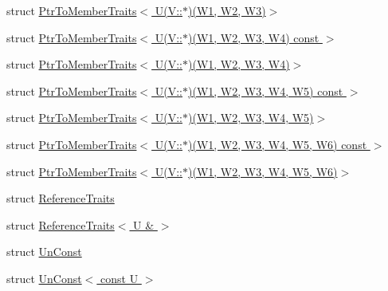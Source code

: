 \begin{DoxyCompactItemize}
struct \hyperlink{structTypeTraits_1_1PtrToMemberTraits_3_01U_07V_1_1_5_08_07W1_00_01W2_00_01W3_08_4}{Ptr\+To\+Member\+Traits$<$ U(\+V\+::$\ast$)(\+W1, W2, W3)$>$}
\item 
struct \hyperlink{structTypeTraits_1_1PtrToMemberTraits_3_01U_07V_1_1_5_08_07W1_00_01W2_00_01W3_00_01W4_08_01const_01_01_4}{Ptr\+To\+Member\+Traits$<$ U(\+V\+::$\ast$)(\+W1, W2, W3, W4) const  $>$}
\item 
struct \hyperlink{structTypeTraits_1_1PtrToMemberTraits_3_01U_07V_1_1_5_08_07W1_00_01W2_00_01W3_00_01W4_08_4}{Ptr\+To\+Member\+Traits$<$ U(\+V\+::$\ast$)(\+W1, W2, W3, W4)$>$}
\item 
struct \hyperlink{structTypeTraits_1_1PtrToMemberTraits_3_01U_07V_1_1_5_08_07W1_00_01W2_00_01W3_00_01W4_00_01W5_08_01const_01_01_4}{Ptr\+To\+Member\+Traits$<$ U(\+V\+::$\ast$)(\+W1, W2, W3, W4, W5) const  $>$}
\item 
struct \hyperlink{structTypeTraits_1_1PtrToMemberTraits_3_01U_07V_1_1_5_08_07W1_00_01W2_00_01W3_00_01W4_00_01W5_08_4}{Ptr\+To\+Member\+Traits$<$ U(\+V\+::$\ast$)(\+W1, W2, W3, W4, W5)$>$}
\item 
struct \hyperlink{structTypeTraits_1_1PtrToMemberTraits_3_01U_07V_1_1_5_08_07W1_00_01W2_00_01W3_00_01W4_00_01W5_00_01W6_08_01const_01_01_4}{Ptr\+To\+Member\+Traits$<$ U(\+V\+::$\ast$)(\+W1, W2, W3, W4, W5, W6) const  $>$}
\item 
struct \hyperlink{structTypeTraits_1_1PtrToMemberTraits_3_01U_07V_1_1_5_08_07W1_00_01W2_00_01W3_00_01W4_00_01W5_00_01W6_08_4}{Ptr\+To\+Member\+Traits$<$ U(\+V\+::$\ast$)(\+W1, W2, W3, W4, W5, W6)$>$}
\item 
struct \hyperlink{structTypeTraits_1_1ReferenceTraits}{Reference\+Traits}
\item 
struct \hyperlink{structTypeTraits_1_1ReferenceTraits_3_01U_01_6_01_4}{Reference\+Traits$<$ U \& $>$}
\item 
struct \hyperlink{structTypeTraits_1_1UnConst}{Un\+Const}
\item 
struct \hyperlink{structTypeTraits_1_1UnConst_3_01const_01U_01_4}{Un\+Const$<$ const U $>$}
\end{DoxyCompactItemize}

